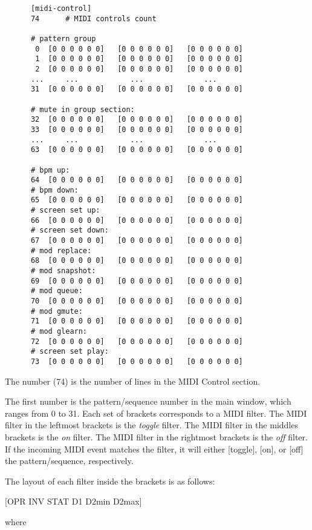    \begin{verbatim}
      [midi-control]
      74      # MIDI controls count

      # pattern group
       0  [0 0 0 0 0 0]   [0 0 0 0 0 0]   [0 0 0 0 0 0]            
       1  [0 0 0 0 0 0]   [0 0 0 0 0 0]   [0 0 0 0 0 0]          
       2  [0 0 0 0 0 0]   [0 0 0 0 0 0]   [0 0 0 0 0 0]   
      ...     ...            ...              ...
      31  [0 0 0 0 0 0]   [0 0 0 0 0 0]   [0 0 0 0 0 0]    

      # mute in group section:
      32  [0 0 0 0 0 0]   [0 0 0 0 0 0]   [0 0 0 0 0 0]   
      33  [0 0 0 0 0 0]   [0 0 0 0 0 0]   [0 0 0 0 0 0]   
      ...     ...            ...              ...
      63  [0 0 0 0 0 0]   [0 0 0 0 0 0]   [0 0 0 0 0 0]   

      # bpm up:
      64  [0 0 0 0 0 0]   [0 0 0 0 0 0]   [0 0 0 0 0 0]   
      # bpm down:
      65  [0 0 0 0 0 0]   [0 0 0 0 0 0]   [0 0 0 0 0 0]   
      # screen set up:
      66  [0 0 0 0 0 0]   [0 0 0 0 0 0]   [0 0 0 0 0 0]   
      # screen set down:
      67  [0 0 0 0 0 0]   [0 0 0 0 0 0]   [0 0 0 0 0 0]   
      # mod replace:
      68  [0 0 0 0 0 0]   [0 0 0 0 0 0]   [0 0 0 0 0 0]   
      # mod snapshot:
      69  [0 0 0 0 0 0]   [0 0 0 0 0 0]   [0 0 0 0 0 0]   
      # mod queue:
      70  [0 0 0 0 0 0]   [0 0 0 0 0 0]   [0 0 0 0 0 0]   
      # mod gmute:
      71  [0 0 0 0 0 0]   [0 0 0 0 0 0]   [0 0 0 0 0 0]   
      # mod glearn:
      72  [0 0 0 0 0 0]   [0 0 0 0 0 0]   [0 0 0 0 0 0]   
      # screen set play:
      73  [0 0 0 0 0 0]   [0 0 0 0 0 0]   [0 0 0 0 0 0]   
   \end{verbatim}

   The number (74) is the number of lines in the MIDI Control section.

   The first number is the pattern/sequence number in the main window, which
   ranges from 0 to 31.  Each set of brackets corresponds to a MIDI filter.
   The MIDI filter in the leftmost brackets is the \textsl{toggle} filter.
   The MIDI filter in the middles brackets is the \textsl{on} filter.
   The MIDI filter in the rightmost brackets is the \textsl{off} filter.
   If the incoming MIDI event matches the filter, it will either [toggle],
   [on], or [off] the pattern/sequence, respectively.

   The layout of each filter inside the brackets is as follows:

      [OPR INV STAT D1 D2min D2max]

   where

